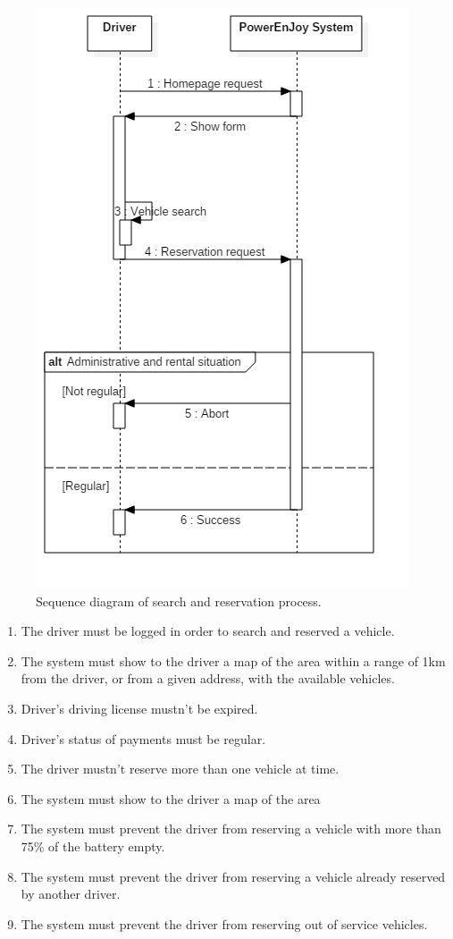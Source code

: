 \begin{figure}[H]
	\begin{center}
		\centering
		\includegraphics[height=0.9\textheight, keepaspectratio]{sequence_diagram/SearchReservation.png}
		\caption{Sequence diagram of search and reservation process.}
	\end{center}
\end{figure}


\begin{enumerate}
	\item The driver must be logged in order to search and reserved a vehicle.
	\item The system must show to the driver a map of the area within a range of 1km from the driver, or from a given address, with the available vehicles.
	\item Driver's driving license mustn't be expired. \label{f-expired}
	\item Driver's status of payments must be regular. \label{f-regular}
	\item The driver mustn't reserve more than one vehicle at time. \label{f-more}	
	\item The system must show to the driver a map of the area 
	\item The system must prevent the driver from reserving a vehicle with more than 75\% of the battery empty.
	\item The system must prevent the driver from reserving a vehicle already reserved by another driver.
	\item The system must prevent the driver from reserving out of service vehicles.
\end{enumerate}

